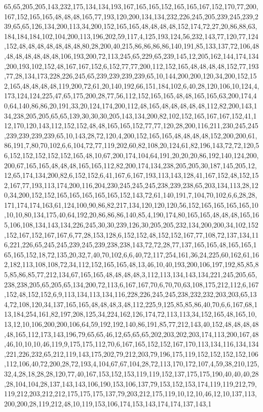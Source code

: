 65,65,205,205,143,232,175,134,134,193,167,165,165,152,165,165,167,152,170,77,200,167,152,165,165,48,48,48,165,77,193,120,200,134,134,232,226,245,205,239,245,239,239,65,65,126,134,200,113,34,200,152,165,165,48,48,48,48,152,174,72,27,20,86,88,63,184,184,184,102,104,200,113,196,202,59,117,4,125,193,124,56,232,143,77,120,77,124,152,48,48,48,48,48,48,48,80,28,200,40,215,86,86,86,86,140,191,85,133,137,72,106,48,48,48,48,48,48,48,106,193,200,72,113,245,65,229,65,239,145,12,205,162,144,174,134,200,193,102,152,48,167,167,152,6,152,77,77,200,112,152,165,48,48,48,48,152,77,193,77,28,134,173,228,226,245,65,239,239,239,239,65,10,144,200,200,120,34,200,152,152,165,48,48,48,48,119,200,72,61,20,140,192,66,151,184,102,6,40,28,120,106,10,124,4,173,124,124,225,47,65,175,200,28,77,56,112,152,165,165,48,48,165,165,63,200,174,40,64,140,86,86,20,191,33,20,124,174,200,112,48,165,48,48,48,48,48,112,82,200,143,134,238,205,205,65,65,139,30,30,30,205,143,134,200,82,102,152,165,167,167,152,41,112,170,120,143,112,152,152,48,48,165,165,152,77,77,120,28,200,116,211,230,245,245,239,239,239,239,65,10,143,28,72,120,4,200,152,165,165,48,48,48,48,152,200,200,61,86,191,7,80,70,102,6,6,104,72,77,119,202,60,82,108,20,124,61,82,196,143,72,72,120,56,152,152,152,152,152,165,48,10,67,200,174,104,64,191,20,20,20,86,192,140,124,200,200,67,165,165,48,48,48,165,165,112,82,200,174,134,238,205,205,30,187,145,205,12,12,65,174,134,200,82,6,152,152,6,41,167,6,167,193,113,143,128,41,167,152,48,152,152,167,77,193,113,174,200,116,204,230,245,245,245,238,239,238,65,203,134,113,28,120,34,200,152,152,165,165,165,165,165,152,143,72,61,140,191,7,104,70,102,6,6,28,28,171,174,174,163,61,124,100,90,86,82,217,134,120,120,120,56,152,165,165,165,165,10,10,10,80,134,175,40,64,192,20,86,86,86,140,85,4,190,174,80,165,165,48,48,48,165,165,106,108,134,143,134,226,245,30,30,239,126,30,205,205,232,134,200,200,34,102,152,152,167,152,167,167,6,77,28,153,128,6,152,152,48,152,152,167,77,108,72,137,134,116,221,226,65,245,245,239,245,239,238,238,143,72,72,28,77,137,165,165,48,165,165,165,165,152,18,72,135,20,32,7,40,70,102,6,6,40,72,117,254,161,36,24,225,60,162,61,162,182,113,108,108,72,34,112,152,165,165,48,13,46,10,40,193,200,106,197,192,85,85,85,85,86,85,77,212,134,67,165,165,48,48,48,48,3,112,113,134,143,134,221,245,205,65,238,238,205,65,205,65,134,200,72,113,6,167,167,70,6,70,70,63,108,175,212,112,6,167,152,48,152,152,6,9,113,134,113,134,116,228,226,245,245,238,232,232,203,203,65,134,72,108,120,34,137,165,165,48,48,48,3,48,112,225,9,125,85,85,86,40,70,6,6,167,68,113,184,254,161,82,197,208,125,34,224,162,126,174,72,113,113,34,152,165,48,165,10,13,12,10,106,200,200,106,64,59,192,192,140,86,191,85,77,212,143,40,152,48,48,48,48,48,165,112,173,143,196,79,65,65,46,12,65,65,65,202,203,202,203,174,113,200,167,48,46,10,10,10,46,119,9,175,175,112,70,6,167,165,152,152,167,170,113,134,116,134,134,221,226,232,65,212,119,143,175,202,79,212,203,79,196,175,119,152,152,152,152,106,112,106,40,72,200,28,72,193,4,104,67,67,104,28,72,113,170,172,107,4,59,38,210,125,32,4,28,18,28,28,120,77,40,167,153,152,153,119,119,152,137,175,175,190,40,40,40,28,28,104,104,28,137,143,143,106,190,153,106,137,79,153,152,153,174,119,119,212,79,119,212,203,212,212,175,175,175,137,79,203,212,175,119,10,12,10,46,12,10,137,113,200,200,28,119,212,48,10,119,153,106,174,153,143,174,174,137,143,1
